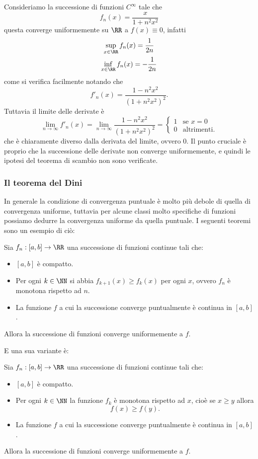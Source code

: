 \documentclass[11pt]{scrartcl}
\begin{document}
	\begin{example}
		Consideriamo la successione di funzioni $C^\infty$ tale che
		$$f_n(x)=\frac{x}{1+n^2x^2}$$
		questa converge uniformemente su $\RR$ a $f(x)\equiv 0$, infatti
		\begin{gather*}
			\sup_{x\in\RR}f_n(x)=\frac{1}{2n} \\
			\inf_{x\in\RR}f_n(x)=-\frac{1}{2n}
		\end{gather*}
		come si verifica facilmente notando che 
		$$f'_n(x)=\frac{1-n^2x^2}{\left(1+n^2x^2\right)^2}.$$
		Tuttavia il limite delle derivate è
		$$\lim_{n\to\infty}f'_n(x)=\lim_{n\to\infty}\frac{1-n^2x^2}{\left(1+n^2x^2\right)^2}=\begin{cases}
			1 & \text{se $x=0$} \\
			0 & \text{altrimenti.}
		\end{cases}$$
		che è chiaramente diverso dalla derivata del limite, ovvero $0$. Il punto cruciale è proprio che la successione delle derivate non converge uniformemente, e quindi le ipotesi del teorema di scambio non sono verificate.
	\end{example}
	\subsubsection{Il teorema del Dini}
	
	In generale la condizione di convergenza puntuale è molto più debole di quella di convergenza uniforme, tuttavia per alcune classi molto specifiche di funzioni possiamo dedurre la convergenza uniforme da quella puntuale. I seguenti teoremi sono un esempio di ciò:
	\begin{theorem}[Dini I]
		Sia $f_n:[a,b]\to\RR$ una successione di funzioni continue tali che:
		\begin{itemize}
			\item $[a,b]$ è compatto.
			\item Per ogni $k\in\NN$ si abbia $f_{k+1}(x)\ge f_k(x)$ per ogni $x$, ovvero $f_n$ è monotona rispetto ad $n$.
			\item La funzione $f$ a cui la successione converge puntualmente è continua in $[a,b]$.
		\end{itemize}
		Allora la successione di funzioni converge uniformemente a $f$.
	\end{theorem}
	E una sua variante è:
	\begin{theorem}[Dini II]
		Sia $f_n:[a,b]\to\RR$ una successione di funzioni continue tali che:
		\begin{itemize}
			\item $[a,b]$ è compatto.
			\item Per ogni $k\in \NN$ la funzione $f_k$ è monotona rispetto ad $x$, cioè se $x\ge y$ allora
			$$f(x)\ge f(y).$$ 
			\item La funzione $f$ a cui la successione converge puntualmente è continua in $[a,b]$.
		\end{itemize}
		Allora la successione di funzioni converge uniformemente a $f$.
	\end{theorem}
	
\end{document}
